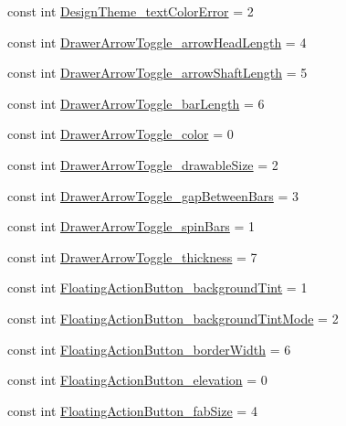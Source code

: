 \begin{CompactItemize}
\item 
const int \hyperlink{class__2doo_1_1_droid_1_1_resource_1_1_styleable_3f59f95a048f1d9f96ef42005b45e63c}{DesignTheme\_\-textColorError} = 2
\item 
const int \hyperlink{class__2doo_1_1_droid_1_1_resource_1_1_styleable_9af99619fe844bf50fd313a24f16194b}{DrawerArrowToggle\_\-arrowHeadLength} = 4
\item 
const int \hyperlink{class__2doo_1_1_droid_1_1_resource_1_1_styleable_679f574795d30e3ea4a91faf4db36b0e}{DrawerArrowToggle\_\-arrowShaftLength} = 5
\item 
const int \hyperlink{class__2doo_1_1_droid_1_1_resource_1_1_styleable_9c53c82e8558546dfb1d06198df0c6f2}{DrawerArrowToggle\_\-barLength} = 6
\item 
const int \hyperlink{class__2doo_1_1_droid_1_1_resource_1_1_styleable_51a063c0bd7bf7868014352415eefc4f}{DrawerArrowToggle\_\-color} = 0
\item 
const int \hyperlink{class__2doo_1_1_droid_1_1_resource_1_1_styleable_ff78b4b1d04bfb5e34f234acb65564e6}{DrawerArrowToggle\_\-drawableSize} = 2
\item 
const int \hyperlink{class__2doo_1_1_droid_1_1_resource_1_1_styleable_a2f649694abfd1db86fd29d7ae01f186}{DrawerArrowToggle\_\-gapBetweenBars} = 3
\item 
const int \hyperlink{class__2doo_1_1_droid_1_1_resource_1_1_styleable_b305daf7b9482300d2ab739349863b2c}{DrawerArrowToggle\_\-spinBars} = 1
\item 
const int \hyperlink{class__2doo_1_1_droid_1_1_resource_1_1_styleable_3d7b1d8d6b7afaae55f6b41baaf5ea59}{DrawerArrowToggle\_\-thickness} = 7
\item 
const int \hyperlink{class__2doo_1_1_droid_1_1_resource_1_1_styleable_8102d7862cb90c37b5c5872ba4eba819}{FloatingActionButton\_\-backgroundTint} = 1
\item 
const int \hyperlink{class__2doo_1_1_droid_1_1_resource_1_1_styleable_8774e13e112b7513363e4cafc60c065a}{FloatingActionButton\_\-backgroundTintMode} = 2
\item 
const int \hyperlink{class__2doo_1_1_droid_1_1_resource_1_1_styleable_57ff4e747ecbde4eafdaae9dc1c2228c}{FloatingActionButton\_\-borderWidth} = 6
\item 
const int \hyperlink{class__2doo_1_1_droid_1_1_resource_1_1_styleable_99198974f81a944b37d7a5c4de743fcf}{FloatingActionButton\_\-elevation} = 0
\item 
const int \hyperlink{class__2doo_1_1_droid_1_1_resource_1_1_styleable_3c4e8f76d5f15298f5db3053e392c588}{FloatingActionButton\_\-fabSize} = 4

\end{CompactItemize}
